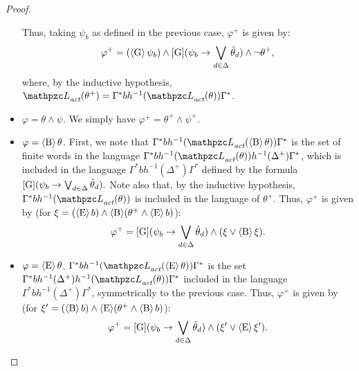 \begin{proof}
\begin{itemize}
  Thus, taking $\psi_b$ as defined in the previous case, $\varphi^{+}$ is given by: 
  \[\varphi^{+}=(\operatorname{\langle G\rangle}\psi_b) \wedge \operatorname{\mathopen[ G \mathclose]}(\psi_b \rightarrow \bigvee_{d\in \Delta}\hat{\theta}_d) \wedge \neg \theta^{+},\]
  where, by the inductive hypothesis, $\Lang_\act(\theta^{+})=\Gamma^{*}b  h^{-1}(\Lang_\act(\theta))\Gamma^{*}$. 
  \item $\varphi = \theta\wedge \psi$. We simply have $\varphi^{+}= \theta^{+}\wedge \psi^{+}$.
  \item $\varphi =\operatorname{\langle B\rangle} \theta$. First, we note that $\Gamma^{*}b h^{-1}(\Lang_\act(\hsB \theta))\Gamma^{*}$ is the set of finite words in the language  $\Gamma^{*}b h^{-1}(\Lang_\act(\theta))h^{-1}(\Delta^+)\Gamma^{*}$, which is included in the
  language  $\Gamma^{*}bh^{-1}(\Delta^+)\Gamma^{*}$ defined by the formula
  $ \operatorname{\mathopen[ G \mathclose]}(\psi_b \rightarrow \bigvee_{d\in \Delta}\hat{\theta}_d).$ Note also that,
  by the inductive hypothesis, $\Gamma^{*}b h^{-1}(\Lang_\act(\theta))$ is included in the language of $\theta^{+}$. %
  Thus, $\varphi^{+}$ is given by (for $\xi=(\operatorname{\langle E\rangle} b) \wedge  \operatorname{\langle B\rangle}(\theta^{+}\wedge \operatorname{\langle E\rangle} b)$):
 \[
 \varphi^{+} =  \operatorname{\mathopen[ G \mathclose]}(\psi_b \rightarrow \bigvee_{d\in \Delta}\hat{\theta}_d) \wedge (\xi\vee \operatorname{\langle B\rangle}\xi).
 \]
%
  \item $\varphi =\operatorname{\langle E\rangle} \theta$. $\Gamma^{*}b h^{-1}(\Lang_\act(\hsE \theta))\Gamma^{*}$ is the set  $\Gamma^{*}b h^{-1}(\Delta^+) h^{-1}(\Lang_\act(\theta))\Gamma^{*}$ included in the
  language  $\Gamma^{*}bh^{-1}(\Delta^+)\Gamma^{*}$, symmetrically to the previous case.
  Thus, $\varphi^{+}$ is given by (for $\xi'=(\operatorname{\langle B\rangle} b) \wedge  \operatorname{\langle E\rangle}(\theta^{+}\wedge \operatorname{\langle B\rangle} b)$):
 \[
 \varphi^{+} =  \operatorname{\mathopen[ G \mathclose]}(\psi_b \rightarrow \bigvee_{d\in \Delta}\hat{\theta}_d) \wedge (\xi'\vee \operatorname{\langle E\rangle}\xi'). \qedhere
\]
 \end{itemize}
%
  \end{proof}


